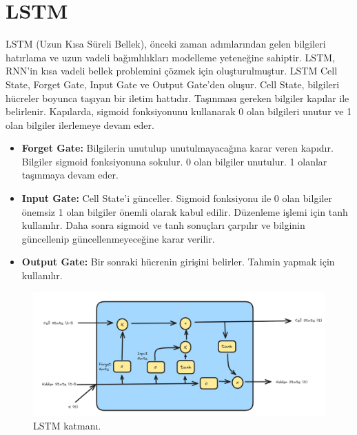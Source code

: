 \section{LSTM}
LSTM (Uzun Kısa Süreli Bellek), önceki zaman adımlarından gelen bilgileri hatırlama ve uzun vadeli bağımlılıkları modelleme yeteneğine sahiptir. LSTM, RNN'in kısa vadeli bellek problemini çözmek için oluşturulmuştur. LSTM Cell State, Forget Gate, Input Gate ve Output Gate'den oluşur. Cell State, bilgileri hücreler boyunca taşıyan bir iletim hattıdır. Taşınması gereken bilgiler kapılar ile belirlenir. Kapılarda, sigmoid fonksiyonunu kullanarak 0 olan bilgileri unutur ve 1 olan bilgiler ilerlemeye devam eder.

\begin{itemize}
    \item \textbf{Forget Gate:} Bilgilerin unutulup unutulmayacağına karar veren kapıdır. Bilgiler sigmoid fonksiyonuna sokulur. 0 olan bilgiler unutulur. 1 olanlar taşınmaya devam eder.
    \item \textbf{Input Gate:} Cell State'i günceller. Sigmoid fonksiyonu ile 0 olan bilgiler önemsiz 1 olan bilgiler önemli olarak kabul edilir. Düzenleme işlemi için tanh kullanılır. Daha sonra sigmoid ve tanh sonuçları çarpılır ve bilginin güncellenip güncellenmeyeceğine karar verilir.
    \item \textbf{Output Gate:} Bir sonraki hücrenin girişini belirler. Tahmin yapmak için kullanılır.
\end{itemize}

\begin{figure}[h]
    \centering
    \includegraphics[width=1\textwidth]{images/LSTM_layer.png}
    \caption{LSTM katmanı.}
    \label{fig:enter-label}
\end{figure}

\newpage